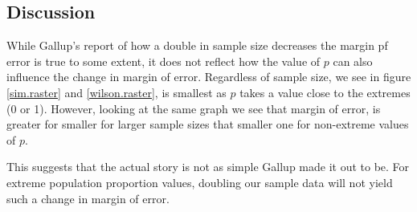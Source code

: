 \documentclass{article}\usepackage[]{graphicx}\usepackage[]{xcolor}
\begin{document}
\begin{multicols}{2}
\section{Discussion}
While Gallup's report of how a double in sample size decreases the margin pf error is true to some extent, it does not reflect how the value of $p$ can also influence the change in margin of error. Regardless of sample size, we see in figure \ref{sim.raster} and \ref{wilson.raster}, is smallest as $p$ takes a value close to the extremes (0 or 1). However, looking at the same graph we see that margin of error, is greater for smaller for larger sample sizes that smaller one for non-extreme values of $p$.

This suggests that the actual story is not as simple Gallup made it out to be. For extreme population proportion values, doubling our sample data will not yield such a change in margin of error.

\vspace{2em}


\begin{tiny}

\end{tiny}
\end{multicols}

\end{document}
